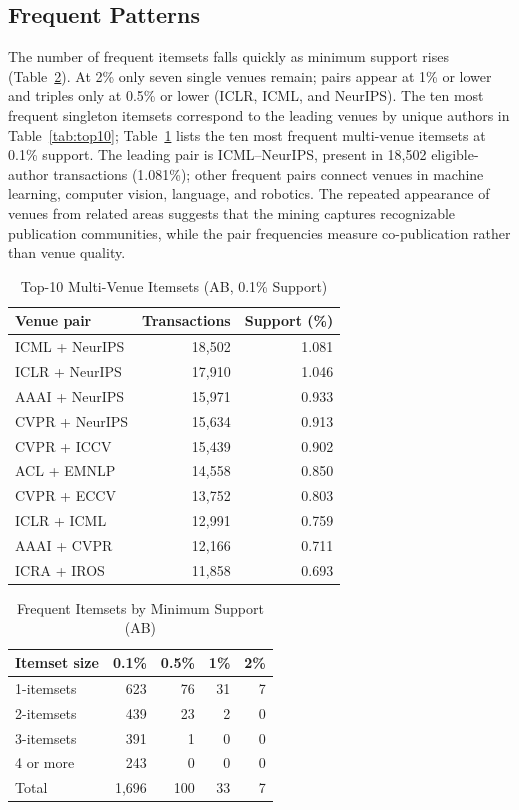 ﻿\documentclass[conference]{IEEEtran}
\begin{document}
\subsection{Frequent Patterns}
The number of frequent itemsets falls quickly as minimum support rises (Table~\ref{tab:itemsets}). At 2\% only seven single venues remain; pairs appear at 1\% or lower and triples only at 0.5\% or lower (ICLR, ICML, and NeurIPS). The ten most frequent singleton itemsets correspond to the leading venues by unique authors in Table~\ref{tab:top10}; Table~\ref{tab:pairs} lists the ten most frequent multi-venue itemsets at 0.1\% support. The leading pair is ICML--NeurIPS, present in 18,502 eligible-author transactions (1.081\%); other frequent pairs connect venues in machine learning, computer vision, language, and robotics. The repeated appearance of venues from related areas suggests that the mining captures recognizable publication communities, while the pair frequencies measure co-publication rather than venue quality.

\begin{table}[t]
\caption{Top-10 Multi-Venue Itemsets (AB, 0.1\% Support)}
\label{tab:pairs}
\centering
\footnotesize
\begin{tabular}{lrr}
\toprule
Venue pair & Transactions & Support (\%) \\
\midrule
ICML + NeurIPS & 18,502 & 1.081 \\
ICLR + NeurIPS & 17,910 & 1.046 \\
AAAI + NeurIPS & 15,971 & 0.933 \\
CVPR + NeurIPS & 15,634 & 0.913 \\
CVPR + ICCV & 15,439 & 0.902 \\
ACL + EMNLP & 14,558 & 0.850 \\
CVPR + ECCV & 13,752 & 0.803 \\
ICLR + ICML & 12,991 & 0.759 \\
AAAI + CVPR & 12,166 & 0.711 \\
ICRA + IROS & 11,858 & 0.693 \\
\bottomrule
\end{tabular}
\end{table}

\begin{table}[t]
\caption{Frequent Itemsets by Minimum Support (AB)}
\label{tab:itemsets}
\centering
\footnotesize
\begin{tabular}{lrrrr}
\toprule
Itemset size & 0.1\% & 0.5\% & 1\% & 2\% \\
\midrule
1-itemsets & 623 & 76 & 31 & 7 \\
2-itemsets & 439 & 23 & 2 & 0 \\
3-itemsets & 391 & 1 & 0 & 0 \\
4 or more & 243 & 0 & 0 & 0 \\
Total & 1,696 & 100 & 33 & 7 \\
\bottomrule
\end{tabular}
\end{table}
\end{document}
